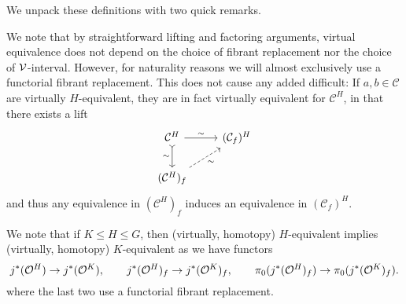 \documentclass[a4paper,10pt
,draft
]{article}%
\renewcommand{\1}{\eta}%
\begin{document}
We unpack these definitions with two quick remarks.

\begin{remark}
      \label{VE_CHOICE_REM}
      We note that by straightforward lifting and factoring arguments,
      virtual equivalence does not depend on the choice of fibrant replacement nor the choice of $\mathcal V$-interval.
      However, for naturality reasons we will almost exclusively use a functorial fibrant replacement.
      This does not cause any added difficult:
      If $a,b\in \mathcal C$ are virtually $H$-equivalent, %
      they are in fact virtually equivalent for $\mathcal C^H$,
      in that there exists a lift
      \begin{equation}
            \label{FIBFIX_LIFT_EQ}
            \begin{tikzcd}
                  \mathcal C^H \arrow[d, tail, "\sim"'] \arrow[r, "\sim"]
                  &
                  (\mathcal C_f)^H
                  \\
                  (\mathcal C^H)_f \arrow[ur, dashed, "\sim"']
            \end{tikzcd}
      \end{equation}
      and thus any equivalence in $(\mathcal C^H)_f$ induces an equivalence in $(\mathcal C_f)^H$.
\end{remark}

\begin{remark}
      \label{HK_EQUIV_REM}
      We note that if $K \leq H \leq G$, then (virtually, homotopy) $H$-equivalent implies (virtually, homotopy) $K$-equivalent
      as we have functors
      \[
            j^{\**}(\O^H) \to j^{\**}(\O^K),
            \qquad
            j^{\**}(\O^H)_f \to j^{\**}(\O^K)_f,
            \qquad
            \pi_0(j^{\**}(\O^H)_f) \to \pi_0(j^{\**}(\O^K)_f).
      \]
      where the last two use a functorial fibrant replacement.
\end{remark}
\end{document}
